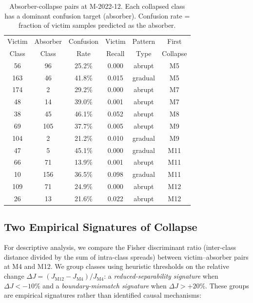 \documentclass[preprint,12pt,authoryear]{elsarticle}
\begin{document}
\begin{table}[!htbp]
\centering
\caption{Absorber-collapse pairs at M-2022-12. Each collapsed class has a dominant confusion target (absorber). Confusion rate = fraction of victim samples predicted as the absorber.}
\label{tab:absorber_pairs}
\small
\begin{tabular}{@{}cccccc@{}}
\toprule
Victim & Absorber & Confusion & Victim & Pattern & First \\
Class  & Class    & Rate      & Recall & Type    & Collapse \\
\midrule
56  & 96  & 25.2\% & 0.000 & abrupt  & M5 \\
163 & 46  & 41.8\% & 0.015 & gradual & M5 \\
174 & 2   & 29.2\% & 0.000 & abrupt  & M7 \\
48  & 14  & 39.0\% & 0.001 & abrupt  & M7 \\
38  & 45  & 46.1\% & 0.052 & abrupt  & M8 \\
69  & 105 & 37.7\% & 0.005 & abrupt  & M9 \\
104 & 2   & 21.2\% & 0.010 & gradual & M9 \\
47  & 5   & 45.1\% & 0.000 & gradual & M11 \\
66  & 71  & 13.9\% & 0.001 & abrupt  & M11 \\
10  & 156 & 36.5\% & 0.098 & gradual & M11 \\
109 & 71  & 24.9\% & 0.000 & abrupt  & M12 \\
26  & 13  & 21.6\% & 0.022 & abrupt  & M12 \\
\bottomrule
\end{tabular}
\end{table}

\subsection{Two Empirical Signatures of Collapse}
\label{sec:mechanisms}

For descriptive analysis, we compare the Fisher discriminant ratio (inter-class distance divided by the sum of intra-class spreads) between victim--absorber pairs at M4 and M12. We group classes using heuristic thresholds on the relative change $\Delta J = (J_{\text{M12}} - J_{\text{M4}}) / J_{\text{M4}}$: a \textit{reduced-separability signature} when $\Delta J < -10\%$ and a \textit{boundary-mismatch signature} when $\Delta J > +20\%$. These groups are empirical signatures rather than identified causal mechanisms:
\end{document}
